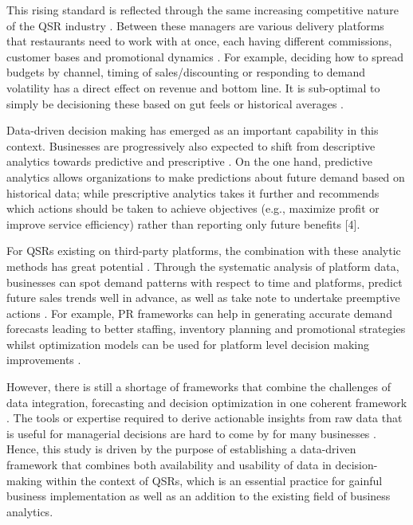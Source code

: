 This rising standard is reflected through the same increasing competitive nature of the QSR industry \citep{altenburger2019artificial}. Between these managers are various delivery platforms that restaurants need to work with at once, each having different commissions, customer bases and promotional dynamics \citep{feldman2023managing}. For example, deciding how to spread budgets by channel, timing of sales/discounting or responding to demand volatility has a direct effect on revenue and bottom line. It is sub-optimal to simply be decisioning these based on gut feels or historical averages \citep{cai2023marketing}.

Data-driven decision making has emerged as an important capability in this context. Businesses are progressively also expected to shift from descriptive analytics towards predictive and prescriptive \citep{berkhout2024revisiting}. On the one hand, predictive analytics allows organizations to make predictions about future demand based on historical data; while prescriptive analytics takes it further and recommends which actions should be taken to achieve objectives (e.g., maximize profit or improve service efficiency) rather than reporting only future benefits [4].

For QSRs existing on third-party platforms, the combination with these analytic methods has great potential \citep{li2024criticality}. Through the systematic analysis of platform data, businesses can spot demand patterns with respect to time and platforms, predict future sales trends well in advance, as well as take note to undertake preemptive actions \citep{wu2025does}. For example, PR frameworks can help in generating accurate demand forecasts leading to better staffing, inventory planning and promotional strategies whilst optimization models can be used for platform level decision making improvements \citep{shen2025jd}.


However, there is still a shortage of frameworks that combine the challenges of data integration, forecasting and decision optimization in one coherent framework \citep{khan2025model}. The tools or expertise required to derive actionable insights from raw data that is useful for managerial decisions are hard to come by for many businesses \citep{zhang2025timeraf}. Hence, this study is driven by the purpose of establishing a data-driven framework that combines both availability and usability of data in decision-making within the context of QSRs, which is an essential practice for gainful business implementation as well as an addition to the existing field of business analytics.

